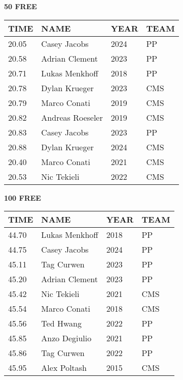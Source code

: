 \begin{minipage}[t]{0.48\textwidth}
\centering
\textbf{50 FREE}\\[0.05cm]
\begin{tabular}{@{}p{1.8cm}p{2.8cm}p{1.2cm}p{1.4cm}@{}}
\hline
\textbf{TIME} & \textbf{NAME} & \textbf{YEAR} & \textbf{TEAM} \\
\hline
20.05 & Casey Jacobs & 2024 & PP \\
20.58 & Adrian Clement & 2023 & PP \\
20.71 & Lukas Menkhoff & 2018 & PP \\
20.78 & Dylan Krueger & 2023 & CMS \\
20.79 & Marco Conati & 2019 & CMS \\
20.82 & Andreas Roeseler & 2019 & CMS \\
20.83 & Casey Jacobs & 2023 & PP \\
20.88 & Dylan Krueger & 2024 & CMS \\
20.40 & Marco Conati & 2021 & CMS \\
20.53 & Nic Tekieli & 2022 & CMS \\
\hline
\end{tabular}
\end{minipage}\hfill
\begin{minipage}[t]{0.48\textwidth}
\centering
\textbf{100 FREE}\\[0.05cm]
\begin{tabular}{@{}p{1.8cm}p{2.8cm}p{1.2cm}p{1.4cm}@{}}
\hline
\textbf{TIME} & \textbf{NAME} & \textbf{YEAR} & \textbf{TEAM} \\
\hline
44.70 & Lukas Menkhoff & 2018 & PP \\
44.75 & Casey Jacobs & 2024 & PP \\
45.11 & Tag Curwen & 2023 & PP \\
45.20 & Adrian Clement & 2023 & PP \\
45.42 & Nic Tekieli & 2021 & CMS \\
45.54 & Marco Conati & 2018 & CMS \\
45.56 & Ted Hwang & 2022 & PP \\
45.85 & Anzo Degiulio & 2021 & PP \\
45.86 & Tag Curwen & 2022 & PP \\
45.95 & Alex Poltash & 2015 & CMS \\
\hline
\end{tabular}
\end{minipage}

\vspace{0.4cm}

